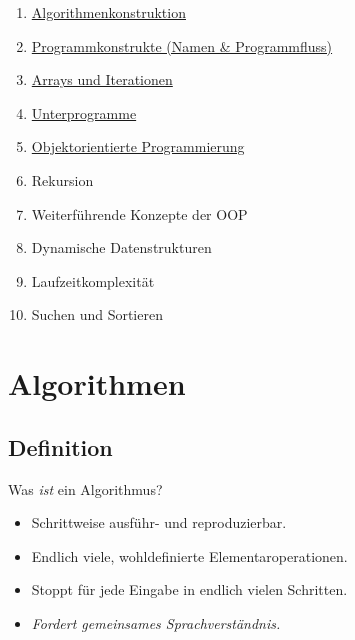 {\begin{frame}[c]{}
{\begin{enumerate}
   \item<3-> \hyperlink{btdl@section.1}{Algorithmenkonstruktion}
   \item<3-> \hyperlink{btdl@section.2}{Programmkonstrukte (Namen \& Programmfluss)}
   \item<3-> \hyperlink{btdl@section.3}{Arrays und Iterationen}
   \item<3-> \hyperlink{btdl@section.4}{Unterprogramme}
   \item<3-> \hyperlink{btdl@section.5}{Objektorientierte Programmierung}\bigskip
   \item<3->[\g 6.] \g Rekursion
   \item<3->[\g 7.] \g Weiterführende Konzepte der OOP
   \item<3->[\g 8.] \g Dynamische Datenstrukturen
   \item<3->[\g 9.] \g Laufzeitkomplexität
   \item<3->[\g10.] \g Suchen und Sortieren
\end{enumerate}}%
\end{frame}
}
\fi

\section{Algorithmen}

\subsection{Definition}
\begin{frame}[c]{Was \textit{ist} ein Algorithmus?}
   \begin{center}
   \end{center}\vfill
\begin{itemize}
      \itemsep8pt
      \item<3-> Schrittweise ausführ- und reproduzierbar.
      \item<4-> Endlich viele, wohldefinierte Elementaroperationen.
      \item<5-> Stoppt für jede Eingabe in endlich vielen Schritten.\bigskip
      \item<6->[\color{gray}\defaultitemizeblock] {\color{gray}\itshape Fordert gemeinsames Sprachverständnis.}
\end{itemize}
\end{frame}

